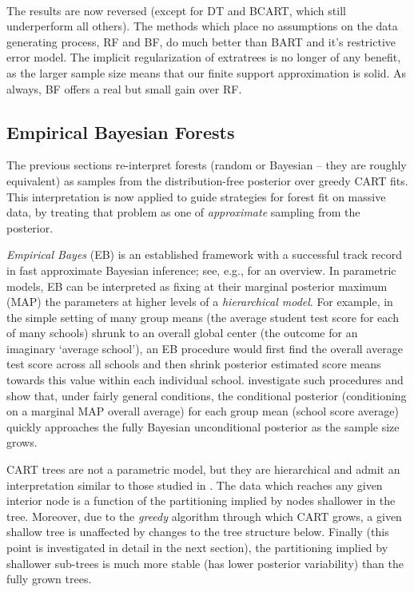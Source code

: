 \documentclass[12pt]{article}
\begin{document}
    \begin{center}
    \end{center}
    { \hspace*{\fill} \\}
    
    The results are now reversed (except for DT and BCART, which still
underperform all others). The methods which place no assumptions on the
data generating process, RF and BF, do much better than BART and it's
restrictive error model. The implicit regularization of extratrees is no
longer of any benefit, as the larger sample size means that our finite
support approximation is solid. As always, BF offers a real but small
gain over RF.

    \subsection{Empirical Bayesian
Forests}\label{empirical-bayesian-forests}

The previous sections re-interpret forests (random or Bayesian -- they
are roughly equivalent) as samples from the distribution-free posterior
over greedy CART fits. This interpretation is now applied to guide
strategies for forest fit on massive data, by treating that problem as
one of \emph{approximate} sampling from the posterior.

\emph{Empirical Bayes} (EB) is an established framework with a
successful track record in fast approximate Bayesian inference; see,
e.g., \cite{efron_large-scale_2010} for an overview. In parametric
models, EB can be interpreted as fixing at their marginal posterior
maximum (MAP) the parameters at higher levels of a \emph{hierarchical
model}. For example, in the simple setting of many group means (the
average student test score for each of many schools) shrunk to an
overall global center (the outcome for an imaginary `average school'),
an EB procedure would first find the overall average test score across
all schools and then shrink posterior estimated score means towards this
value within each individual school. \cite{kass_approximate_1989}
investigate such procedures and show that, under fairly general
conditions, the conditional posterior (conditioning on a marginal MAP
overall average) for each group mean (school score average) quickly
approaches the fully Bayesian unconditional posterior as the sample size
grows.

CART trees are not a parametric model, but they are hierarchical and
admit an interpretation similar to those studied in
\cite{kass_approximate_1989}. The data which reaches any given interior
node is a function of the partitioning implied by nodes shallower in the
tree. Moreover, due to the \emph{greedy} algorithm through which CART
grows, a given shallow tree is unaffected by changes to the tree
structure below. Finally (this point is investigated in detail in the
next section), the partitioning implied by shallower sub-trees is much
more stable (has lower posterior variability) than the fully grown
trees.
\end{document}
